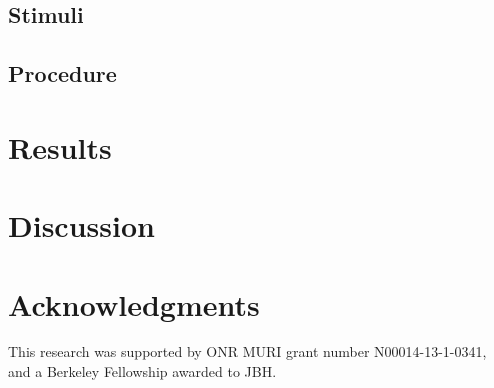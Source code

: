 \documentclass[10pt,letterpaper]{article}
\begin{document}
\subsection{Stimuli}


\subsection{Procedure}


\section{Results}


\section{Discussion}


\section{Acknowledgments}

This research was supported by ONR MURI grant number N00014-13-1-0341,
and a Berkeley Fellowship awarded to JBH.



\setlength{\bibleftmargin}{.125in}
\setlength{\bibindent}{-\bibleftmargin}


\end{document}

